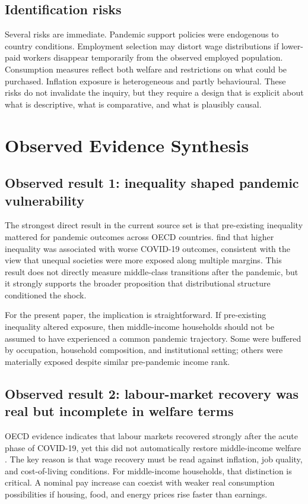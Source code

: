 \documentclass[11pt]{article}
\begin{document}
\subsection{Identification risks}
Several risks are immediate. Pandemic support policies were endogenous to country conditions. Employment selection may distort wage distributions if lower-paid workers disappear temporarily from the observed employed population. Consumption measures reflect both welfare and restrictions on what could be purchased. Inflation exposure is heterogeneous and partly behavioural. These risks do not invalidate the inquiry, but they require a design that is explicit about what is descriptive, what is comparative, and what is plausibly causal.

\section{Observed Evidence Synthesis}

\subsection{Observed result 1: inequality shaped pandemic vulnerability}
The strongest direct result in the current source set is that pre-existing inequality mattered for pandemic outcomes across OECD countries. \citet{covid19andincomein2021springer} find that higher inequality was associated with worse COVID-19 outcomes, consistent with the view that unequal societies were more exposed along multiple margins. This result does not directly measure middle-class transitions after the pandemic, but it strongly supports the broader proposition that distributional structure conditioned the shock.

For the present paper, the implication is straightforward. If pre-existing inequality altered exposure, then middle-income households should not be assumed to have experienced a common pandemic trajectory. Some were buffered by occupation, household composition, and institutional setting; others were materially exposed despite similar pre-pandemic income rank.

\subsection{Observed result 2: labour-market recovery was real but incomplete in welfare terms}
OECD evidence indicates that labour markets recovered strongly after the acute phase of COVID-19, yet this did not automatically restore middle-income welfare \citep{oecdemploymentoutl2024oecd}. The key reason is that wage recovery must be read against inflation, job quality, and cost-of-living conditions. For middle-income households, that distinction is critical. A nominal pay increase can coexist with weaker real consumption possibilities if housing, food, and energy prices rise faster than earnings.
\end{document}
